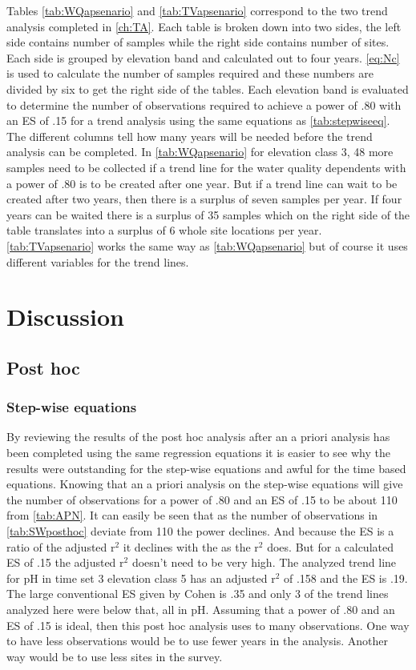
Tables \autoref{tab:WQapsenario} and \autoref{tab:TVapsenario} correspond to the two trend analysis completed in \autoref{ch:TA}.
Each table is  broken down into two sides, the left side contains number of samples while the right side contains number of sites.
Each side is grouped by elevation band and calculated out to four years.
\autoref{eq:Nc} is used to calculate the number of samples required and these numbers are divided by six to get the right side of the tables.
Each elevation band is evaluated to determine the number of observations required to achieve a power of .80 with an ES of .15 for a trend analysis using the same equations as \autoref{tab:stepwiseeq}.
The different columns tell how many years will be needed before the trend analysis can be completed.
In \autoref{tab:WQapsenario} for elevation class 3, 48 more samples need to be collected if a trend line for the water quality dependents with a power of .80 is to be created after one year.  
But if a trend line can wait to be created after two years, then there is a surplus of seven samples per year.  
If four years can be waited there is a surplus of 35 samples which on the right side of the table translates into a surplus of 6 whole site locations per year.
\autoref{tab:TVapsenario} works the same way as \autoref{tab:WQapsenario} but of course it uses different variables for the trend lines.

\section{Discussion}

\subsection{Post hoc}
\subsubsection{Step-wise equations}
By reviewing the results of the post hoc analysis after an a priori analysis has been completed using the same regression equations it is easier to see why the results were outstanding for the step-wise equations and awful for the time based equations.
Knowing that an a priori analysis on the step-wise equations will give the number of observations for a power of .80 and an ES of .15 to be about 110 from \autoref{tab:APN}.
It can easily be seen that as the number of observations in \autoref{tab:SWposthoc} deviate from 110 the power declines.
And because the ES is a ratio of the adjusted r$^2$ it declines with the as the r$^2$ does.
But for a calculated ES of .15 the adjusted r$^2$ doesn't need to be very high.
The analyzed trend line for pH in time set 3 elevation class 5 has an adjusted r$^2$ of .158 and the ES is .19.
The large conventional ES given by Cohen is .35 and only 3 of the trend lines analyzed here were below that, all in pH.
Assuming that a power of .80 and an ES of .15 is ideal, then this post hoc analysis uses to many observations.
One way to have less observations would be to use fewer years in the analysis.
Another way would be to use less sites in the survey.
